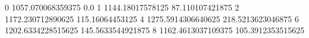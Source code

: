 0 1057.070068359375 0.0
1 1144.18017578125 87.110107421875
2 1172.230712890625 115.16064453125
4 1275.5914306640625 218.5213623046875
6 1202.6334228515625 145.5633544921875
8 1162.4613037109375 105.3912353515625
